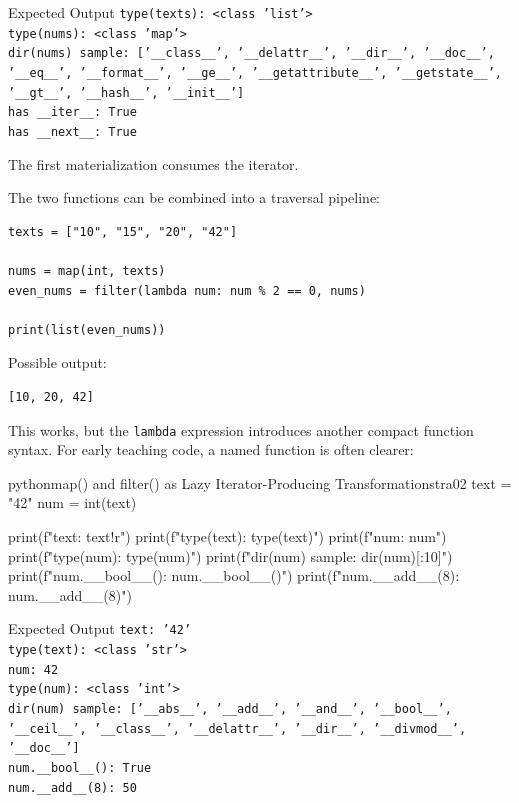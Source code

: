 \begin{iobox}{Expected Output}
\texttt{type(texts): <class 'list'>} \\
\texttt{type(nums): <class 'map'>} \\
\texttt{dir(nums) sample: ['\_\_class\_\_', '\_\_delattr\_\_', '\_\_dir\_\_', '\_\_doc\_\_',} \\
\texttt{'\_\_eq\_\_', '\_\_format\_\_', '\_\_ge\_\_', '\_\_getattribute\_\_', '\_\_getstate\_\_',} \\
\texttt{'\_\_gt\_\_', '\_\_hash\_\_', '\_\_init\_\_']} \\
\texttt{has \_\_iter\_\_: True} \\
\texttt{has \_\_next\_\_: True} \\
\end{iobox}




The first materialization consumes the iterator.

The two functions can be combined into a traversal pipeline:

\begin{verbatim}
texts = ["10", "15", "20", "42"]

nums = map(int, texts)
even_nums = filter(lambda num: num % 2 == 0, nums)

print(list(even_nums))
\end{verbatim}

Possible output:

\begin{verbatim}
[10, 20, 42]
\end{verbatim}

This works, but the \texttt{lambda} expression introduces another compact function syntax. For early teaching code, a named function is often clearer:

\begin{codebox}[]{python}{map() and filter() as Lazy Iterator-Producing Transformations}{tra02}
text = "42"
num = int(text)

print(f"text: {text!r}")
print(f"type(text): {type(text)}")
print(f"num: {num}")
print(f"type(num): {type(num)}")
print(f"dir(num) sample: {dir(num)[:10]}")
print(f"num.__bool__(): {num.__bool__()}")
print(f"num.__add__(8): {num.__add__(8)}")
\end{codebox}


\begin{iobox}{Expected Output}
\texttt{text: '42'} \\
\texttt{type(text): <class 'str'>} \\
\texttt{num: 42} \\
\texttt{type(num): <class 'int'>} \\
\texttt{dir(num) sample: ['\_\_abs\_\_', '\_\_add\_\_', '\_\_and\_\_', '\_\_bool\_\_',} \\
\texttt{'\_\_ceil\_\_', '\_\_class\_\_', '\_\_delattr\_\_', '\_\_dir\_\_', '\_\_divmod\_\_',} \\
\texttt{'\_\_doc\_\_']} \\
\texttt{num.\_\_bool\_\_(): True} \\
\texttt{num.\_\_add\_\_(8): 50} \\
\end{iobox}




